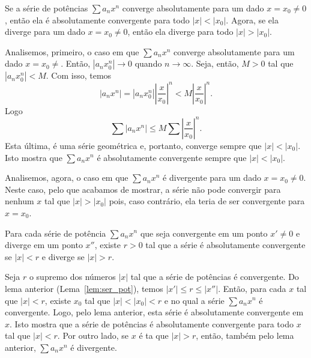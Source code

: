 \begin{lem}\label{lem:ser_pot}
  Se a série de potências $\sum a_nx^n$ converge absolutamente para um dado $x=x_0\neq 0$, então ela é absolutamente convergente para todo $|x|<|x_0|$. Agora, se ela diverge para um dado $x=x_0\neq 0$, então ela diverge para todo $|x|>|x_0|$.
\end{lem}
\begin{dem}
  Analisemos, primeiro, o caso em que $\sum a_nx^n$ converge absolutamente para um dado $x=x_0\neq$. Então, $|a_nx_0^n|\to 0$ quando $n\to \infty$. Seja, então, $M>0$ tal que $|a_nx_0^n| < M$. Com isso, temos
  \begin{equation}
    |a_nx^n| = |a_nx_0^n|\left|\frac{x}{x_0}\right|^n < M\left|\frac{x}{x_0}\right|^n.
  \end{equation}
Logo
\begin{equation}
  \sum |a_nx^n| \leq M\sum \left|\frac{x}{x_0}\right|^n.
\end{equation}
Esta última, é uma série geométrica e, portanto, converge sempre que $|x|<|x_0|$. Isto mostra que $\sum a_nx^n$ é absolutamente convergente sempre que $|x|<|x_0|$.

Analisemos, agora, o caso em que $\sum a_nx^n$ é divergente para um dado $x=x_0\neq 0$. Neste caso, pelo que acabamos de mostrar, a série não pode convergir para nenhum $x$ tal que $|x|>|x_0|$ pois, caso contrário, ela teria de ser convergente para $x=x_0$.
\end{dem}

\begin{teo}
  Para cada série de potência $\sum a_nx^n$ que seja convergente em um ponto $x'\neq 0$ e diverge em um ponto $x''$, existe $r>0$ tal que a série é absolutamente convergente se $|x|<r$ e diverge se $|x|>r$.
\end{teo}
\begin{dem}
  Seja $r$ o supremo dos números $|x|$ tal que a série de potências é convergente. Do lema anterior (Lema~\ref{lem:ser_pot}), temos $|x'|\leq r \leq |x''|$. Então, para cada $x$ tal que $|x|<r$, existe $x_0$ tal que $|x|<|x_0|<r$ e no qual a série $\sum a_nx^n$ é convergente. Logo, pelo lema anterior, esta série é absolutamente convergente em $x$. Isto mostra que a série de potências é absolutamente convergente para todo $x$ tal que $|x|<r$. Por outro lado, se $x$ é ta que $|x|>r$, então, também pelo lema anterior, $\sum a_nx^n$ é divergente.
\end{dem}